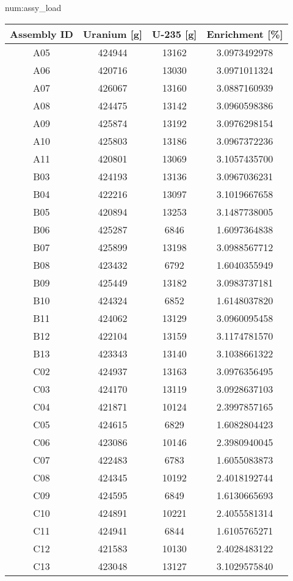 \begin{numitem}{num:assy_load}
 \begin{center}
  \begin{longtable}{c c c c}
    \toprule
    Assembly ID & Uranium [g] & U-235 [g] & Enrichment [\%] \\
    \midrule
    \midrule
A05&424944&13162&3.0973492978\\
A06&420716&13030&3.0971011324\\
A07&426067&13160&3.0887160939\\
A08&424475&13142&3.0960598386\\
A09&425874&13192&3.0976298154\\
A10&425803&13186&3.0967372236\\
A11&420801&13069&3.1057435700\\
B03&424193&13136&3.0967036231\\
B04&422216&13097&3.1019667658\\
B05&420894&13253&3.1487738005\\
B06&425287&6846 &1.6097364838\\
B07&425899&13198&3.0988567712\\
B08&423432&6792 &1.6040355949\\
B09&425449&13182&3.0983737181\\
B10&424324&6852 &1.6148037820\\
B11&424062&13129&3.0960095458\\
B12&422104&13159&3.1174781570\\
B13&423343&13140&3.1038661322\\
C02&424937&13163&3.0976356495\\
C03&424170&13119&3.0928637103\\
C04&421871&10124&2.3997857165\\
C05&424615&6829 &1.6082804423\\
C06&423086&10146&2.3980940045\\
C07&422483&6783 &1.6055083873\\
C08&424345&10192&2.4018192744\\
C09&424595&6849 &1.6130665693\\
C10&424891&10221&2.4055581314\\
C11&424941&6844 &1.6105765271\\
C12&421583&10130&2.4028483122\\
C13&423048&13127&3.1029575840\\

\end{longtable}
\end{center}
\end{numitem}
